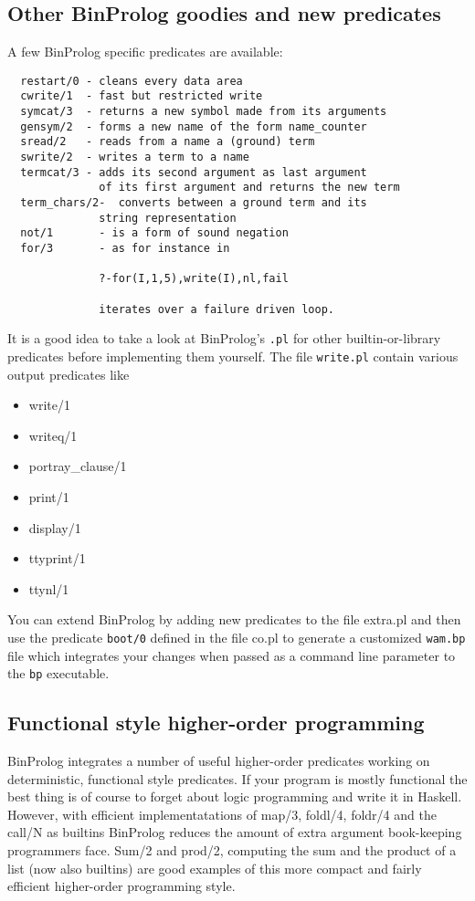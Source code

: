 \documentclass{article}
\begin{document}
\subsection{Other BinProlog goodies and new predicates}

A few BinProlog specific predicates are available:

\begin{verbatim}
  restart/0 - cleans every data area
  cwrite/1  - fast but restricted write
  symcat/3  - returns a new symbol made from its arguments
  gensym/2  - forms a new name of the form name_counter
  sread/2   - reads from a name a (ground) term
  swrite/2  - writes a term to a name
  termcat/3 - adds its second argument as last argument 
              of its first argument and returns the new term
  term_chars/2-  converts between a ground term and its
              string representation
  not/1       - is a form of sound negation
  for/3       - as for instance in

              ?-for(I,1,5),write(I),nl,fail

              iterates over a failure driven loop.
\end{verbatim}

It is a good idea to take a look at BinProlog's {\tt *.pl} for
other builtin-or-library predicates before implementing them yourself.
The file {\tt write.pl} contain various output predicates like
\begin{itemize}
\item write/1
\item writeq/1
\item portray\_clause/1
\item print/1
\item display/1
\item ttyprint/1
\item ttynl/1
\end{itemize}

{\flushleft You} can extend BinProlog by adding new predicates to the file extra.pl
and then use the predicate {\tt boot/0} defined in the file co.pl to
generate a customized {\tt wam.bp} file which integrates your changes
when passed as a command line parameter to the {\tt bp} executable.

\subsection{Functional style higher-order programming}


BinProlog  integrates a number of useful higher-order
predicates working on deterministic, functional style predicates.
If your program is mostly functional the best thing is of course
to forget about logic programming and write it in Haskell.
However, with efficient implementatations of
map/3, foldl/4, foldr/4 and the call/N as builtins BinProlog
reduces the amount of extra argument book-keeping programmers
face. Sum/2 and prod/2, computing the sum and the product of
a list (now also builtins)
are good examples of this more compact
and fairly efficient higher-order programming style.
\end{document}
